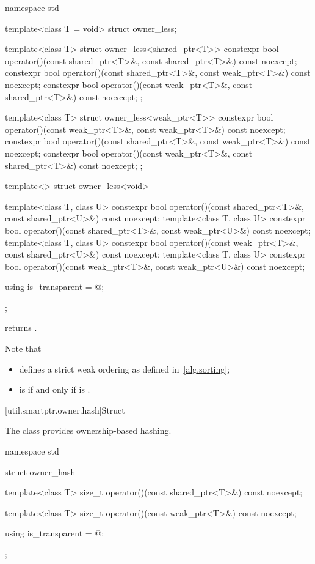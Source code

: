%
\begin{codeblock}
namespace std {
  template<class T = void> struct owner_less;

  template<class T> struct owner_less<shared_ptr<T>> {
    constexpr bool operator()(const shared_ptr<T>&, const shared_ptr<T>&) const noexcept;
    constexpr bool operator()(const shared_ptr<T>&, const weak_ptr<T>&) const noexcept;
    constexpr bool operator()(const weak_ptr<T>&, const shared_ptr<T>&) const noexcept;
  };

  template<class T> struct owner_less<weak_ptr<T>> {
    constexpr bool operator()(const weak_ptr<T>&, const weak_ptr<T>&) const noexcept;
    constexpr bool operator()(const shared_ptr<T>&, const weak_ptr<T>&) const noexcept;
    constexpr bool operator()(const weak_ptr<T>&, const shared_ptr<T>&) const noexcept;
  };

  template<> struct owner_less<void> {
    template<class T, class U>
      constexpr bool operator()(const shared_ptr<T>&, const shared_ptr<U>&) const noexcept;
    template<class T, class U>
      constexpr bool operator()(const shared_ptr<T>&, const weak_ptr<U>&) const noexcept;
    template<class T, class U>
      constexpr bool operator()(const weak_ptr<T>&, const shared_ptr<U>&) const noexcept;
    template<class T, class U>
      constexpr bool operator()(const weak_ptr<T>&, const weak_ptr<U>&) const noexcept;

    using is_transparent = @\unspec@;
  };
}
\end{codeblock}

%
\pnum
{} returns .
\begin{note}
Note that
\begin{itemize}
\item {} defines a strict weak ordering as defined in~\ref{alg.sorting};

\item
{} is 
if and only if  is .
\end{itemize}
\end{note}

[util.smartptr.owner.hash]{Struct }

\pnum
The class  provides ownership-based hashing.

%
\begin{codeblock}
namespace std {
  struct owner_hash {
    template<class T>
      size_t operator()(const shared_ptr<T>&) const noexcept;

    template<class T>
      size_t operator()(const weak_ptr<T>&) const noexcept;

    using is_transparent = @\unspec@;
  };
}
\end{codeblock}

